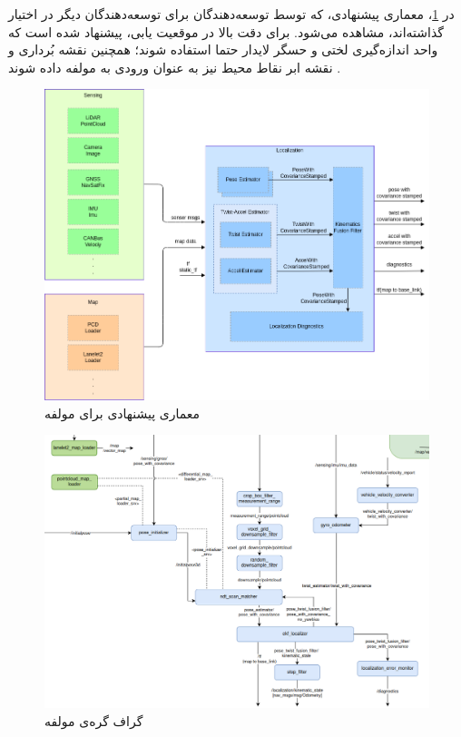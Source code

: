 در \cref{fig:Autoware_Localization_Architecture}، معماری‌ پیشنهادی، که توسط توسعه‌دهندگان  برای توسعه‌دهندگان دیگر در اختیار گذاشته‌اند، مشاهده می‌شود. برای دقت بالا در موقعیت یابی، پیشنهاد شده است که واحد اندازه‌گیری لختی و حسگر لایدار حتما استفاده شوند؛ همچنین نقشه بُرداری و نقشه ابر نقاط محیط نیز به عنوان ورودی به مولفه  داده شوند \cite{Autoware:Documentation}.

\begin{figure}[h!]
    \centering
    \includegraphics[width=0.75\linewidth]{figures/Autoware_Localization_Architecture.png}
    \caption{معماری پیشنهادی  برای مولفه  \cite{Autoware:Documentation}}
    \label{fig:Autoware_Localization_Architecture}
\end{figure}

\begin{figure}[h!]
    \centering
    \includegraphics[width=0.85\linewidth]{figures/Autoware_Localization_Node_Graph.png}
    \caption{گراف گره‌ی مولفه  \cite{Autoware:Documentation}}
    \label{fig:Autoware_Localization_Node_Graph}
\end{figure}


